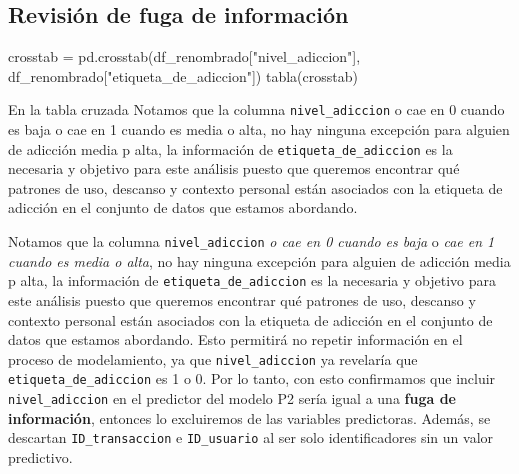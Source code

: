 \documentclass[11pt,spanish,a4paper,]{article}
\newenvironment{Shaded}{\begin{snugshade}}{\end{snugshade}}
\newcommand{\NormalTok}[1]{\textcolor[rgb]{0.00,0.23,0.31}{#1}}
\newcommand{\OperatorTok}[1]{\textcolor[rgb]{0.37,0.37,0.37}{#1}}
\newcommand{\StringTok}[1]{\textcolor[rgb]{0.13,0.47,0.30}{#1}}
\begin{document}
\subsection{Revisión de fuga de información}\label{sec-val-nul}

\begin{Shaded}
\begin{Highlighting}[]
\NormalTok{crosstab }\OperatorTok{=}\NormalTok{ pd.crosstab(df\_renombrado[}\StringTok{"nivel\_adiccion"}\NormalTok{], df\_renombrado[}\StringTok{"etiqueta\_de\_adiccion"}\NormalTok{])}
\NormalTok{tabla(crosstab)}
\end{Highlighting}
\end{Shaded}

\begin{table}

\caption{\label{tbl-crosstab-fuga}Tabla cruzada entre nivel\_adiccion y
etiqueta\_de\_adiccion.}


\end{table}%

En la tabla cruzada Notamos que la columna \texttt{nivel\_adiccion} o
cae en 0 cuando es baja o cae en 1 cuando es media o alta, no hay
ninguna excepción para alguien de adicción media p alta, la información
de \texttt{etiqueta\_de\_adiccion} es la necesaria y objetivo para este
análisis puesto que queremos encontrar qué patrones de uso, descanso y
contexto personal están asociados con la etiqueta de adicción en el
conjunto de datos que estamos abordando.

Notamos que la columna \texttt{nivel\_adiccion} \emph{o cae en 0 cuando
es baja} o \emph{cae en 1 cuando es media o alta}, no hay ninguna
excepción para alguien de adicción media p alta, la información de
\texttt{etiqueta\_de\_adiccion} es la necesaria y objetivo para este
análisis puesto que queremos encontrar qué patrones de uso, descanso y
contexto personal están asociados con la etiqueta de adicción en el
conjunto de datos que estamos abordando. Esto permitirá no repetir
información en el proceso de modelamiento, ya que
\texttt{nivel\_adiccion} ya revelaría que
\texttt{etiqueta\_de\_adiccion} es 1 o 0. Por lo tanto, con esto
confirmamos que incluir \texttt{nivel\_adiccion} en el predictor del
modelo P2 sería igual a una \textbf{fuga de información}, entonces lo
excluiremos de las variables predictoras. Además, se descartan
\texttt{ID\_transaccion} e \texttt{ID\_usuario} al ser solo
identificadores sin un valor predictivo.
\end{document}
